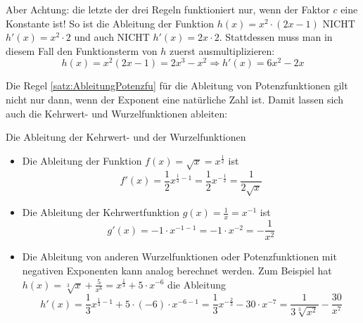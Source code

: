 Aber Achtung: die letzte der drei Regeln funktioniert nur, wenn der Faktor $c$ eine Konstante ist! So ist die Ableitung der Funktion $h(x)=x^2 \cdot (2x-1)$ NICHT $h'(x)=x^2\cdot 2$ und auch NICHT $h'(x)=2x\cdot 2$. Stattdessen muss man in diesem Fall den Funktionsterm von $h$ zuerst ausmultiplizieren:
$$ h(x)=x^2(2x-1)=2x^3-x^2 \Rightarrow h'(x)=6x^2-2x$$

Die Regel \ref*{satz:AbleitungPotenzfu} für die Ableitung von Potenzfunktionen gilt nicht nur dann, wenn der Exponent eine natürliche Zahl ist. Damit lassen sich auch die Kehrwert- und Wurzelfunktionen ableiten:
\begin{bsp}
	{Die Ableitung der Kehrwert- und der Wurzelfunktionen}{}
	\begin{itemize}
		\item Die Ableitung der Funktion $f(x)=\sqrt{x} = x^{\frac{1}{2}}$ ist
		      $$f'(x)=\frac{1}{2}x^{\frac{1}{2}-1}=\frac{1}{2}x^{-\frac{1}{2}}=\frac{1}{2\sqrt{x}}$$
		\item Die Ableitung der Kehrwertfunktion $g(x)=\frac{1}{x}=x^{-1}$ ist
		      $$ g'(x)=-1\cdot x^{-1-1}=-1\cdot x^{-2}=-\frac{1}{x^2}$$
		\item Die Ableitung von anderen Wurzelfunktionen oder Potenzfunktionen mit negativen Exponenten kann analog berechnet werden. Zum Beispiel hat $h(x)=\sqrt[3]{x}+\frac{5}{x^6} = x^{\frac{1}{3}}+ 5\cdot x^{-6}$ die Ableitung
		      $$h'(x)=\frac{1}{3}x^{\frac{1}{3}-1}+5\cdot(-6)\cdot x^{-6-1} = \frac{1}{3}x^{-\frac{2}{3}}-30\cdot x^{-7} = \frac{1}{3\sqrt[3]{x^2}}-\frac{30}{x^7}$$
	\end{itemize}

\end{bsp}
\clearpage
